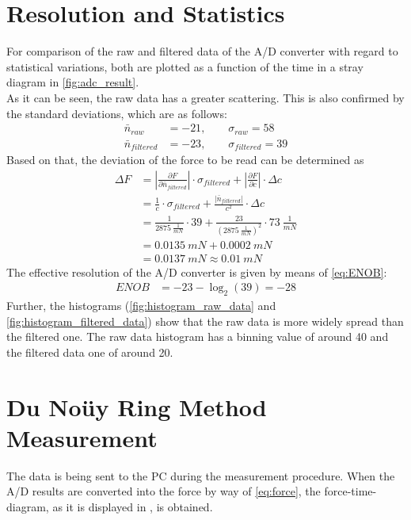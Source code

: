 \section{Resolution and Statistics}
For comparison of the raw and filtered data of the A/D converter with regard to statistical variations, both are plotted as a function of the time in a stray diagram in \cref{fig:adc_result}.\\
As it can be seen, the raw data has a greater scattering. This is also confirmed by the standard deviations, which are as follows:
\begin{align*}
\bar{n}_{raw}&=-21, \qquad \sigma_{raw}=58\\
\bar{n}_{filtered}&=-23, \qquad \sigma_{filtered}=39
\end{align*}
Based on that, the deviation of the force to be read can be determined as
\begin{align*}
\Delta F&=\left| \frac{\partial F}{\partial \bar{n}_{filtered}} \right| \cdot \sigma_{filtered} + \left| \frac{\partial F}{\partial c} \right| \cdot \Delta c \\
&=\frac{1}{c} \cdot \sigma_{filtered} + \frac{\left|\bar{n}_{filtered}\right|}{c^2} \cdot \Delta c \\
&=\frac{1}{\SI{2875}{\frac{1}{mN}}} \cdot 39 + \frac{23}{(\SI{2875}{\frac{1}{mN}})^2} \cdot \SI{73}{\frac{1}{mN}} \\
&=\SI{0.0135}{mN}+\SI{0.0002}{mN} \\
&=\SI{0.0137}{mN} \approx \SI{0.01}{mN}
\end{align*}
The effective resolution of the A/D converter is given by means of \cref{eq:ENOB}:
\begin{align*}
ENOB&=-23-\log_2(39)=-28
\end{align*}
Further, the histograms (\cref{fig:histogram_raw_data} and \cref{fig:histogram_filtered_data}) show that the raw data is more widely spread than the filtered one. The raw data histogram has a binning value of around 40 and the filtered data one of around 20.
%
\section{Du Noüy Ring Method Measurement}
The data is being sent to the PC during the measurement procedure. When the A/D results are converted into the force by way of \cref{eq:force}, the force-time-diagram, as it is displayed in , is obtained.

